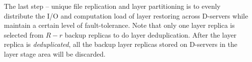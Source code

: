 The last step -- unique file replication and layer partitioning is 
to evenly distribute the I/O and computation load of layer restoring across D-servers 
while maintain a certain level of fault-tolerance.  
Note that only one layer replica is selected from $R-r$ backup replicas to do layer deduplication.
After the layer replica is \emph{deduplicated}, all the backup layer replicas stored on D-servers in the layer stage area will be discarded.  




%
